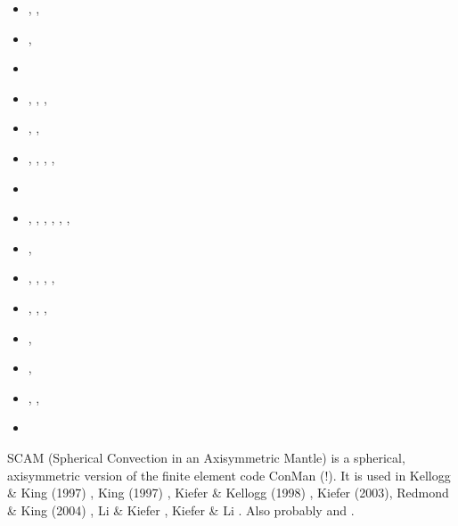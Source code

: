 \begin{itemize}
\begin{scriptsize}
\begin{itemize}
\item[\twothousand]          \textcite{lemo00},  \textcite{conr00}
                             \textcite{elha00},  \textcite{lemo00}
\item[\twothousandone]       \textcite{coha01},  \textcite{huke01}
\item[\twothousandtwo]       \textcite{elvh02}
\item[\twothousandthree]     \textcite{fasa03},  \textcite{taki03},
                             \textcite{safa03},  \textcite{taki03}
\item[\twothousandfour]      \textcite{elhg04},  \textcite{shha04}, \textcite{reki04}
\item[\twothousandfive]      \textcite{kogk05},  \textcite{colt05},
                             \textcite{mish05},  \textcite{shha05}, \textcite{tagu05}
\item[\twothousandsix]       \textcite{nake06}
\item[\twothousandseven]     \textcite{nake07},  \textcite{dadh07}, \textcite{copb07},
                             \textcite{elki07},  \textcite{lohd07}, \textcite{nake07},
                             \textcite{reki07}
\item[\twothousandeight]     \textcite{hash08},  \textcite{dadh08}
\item[\twothousandnine]      \textcite{faho09},  \textcite{heaa09}, \textcite{king09}, 
                             \textcite{leki09},  \textcite{wazh09}
\item[\twothousandten]       \textcite{kilv10},  \textcite{cows10}, 
                             \textcite{hash10},  \textcite{leki10}
\item[\twothousandeleven]    \textcite{hash11},  \textcite{leki11}
\item[\twothousandfourteen]  \textcite{kile14},  \textcite{leli14}
\item[\twothousandfifteen]   \textcite{kifr15},  \textcite{kilk15}, \textcite{lile15}
\item[\twothousandtwentytwo] \textcite{gadm22}
\end{itemize}
\end{scriptsize}

SCAM (Spherical Convection in an Axisymmetric Mantle) is a spherical, axisymmetric version 
of the finite element code ConMan (!). It is used in Kellogg \& King (1997) \cite{keki97}, 
King (1997) \cite{king97}, Kiefer \& Kellogg (1998) \cite{kike98}, Kiefer (2003)\cite{kief03}, 
Redmond \& King (2004) \cite{reki04}, Li \& Kiefer \cite{liki07}, Kiefer \& Li \cite{kili16}.
Also probably \cite{fari94} and \cite{fari95}.


\end{itemize}

